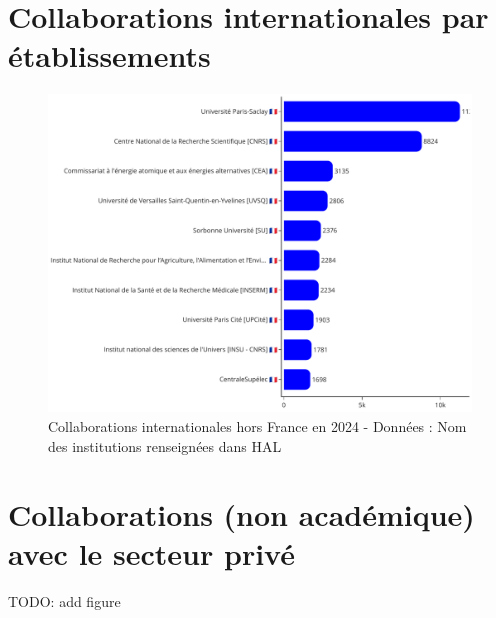 \documentclass[french, 11pt]{dibiso/biso}
\begin{document}






\pagebreak

\section{Collaborations internationales par établissements}

\begin{figure}[!h]
  \includegraphics[width=\textwidth]{figures/collaboration_names.pdf}
  \caption{Collaborations internationales hors France en 2024 - Données : Nom des institutions renseignées dans HAL}
  \label{fig_collab_names}
\end{figure}







\pagebreak

\section{Collaborations (non académique) avec le secteur privé}

TODO: add figure
\end{document}

